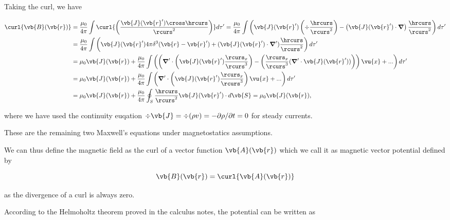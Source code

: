 \documentclass[english,a4paper,12pt]{report}
\begin{document}
Taking the curl, we have

\begin{equation} \label{ampere} 
    \begin{aligned} 
    \curl{\vb{B} (\vb{r} )} &=  \frac{\mu_0 }{4\pi } \int \curl{\left( \frac{\vb{J} (\vb{r} ') \cross \hrcurs}{\rcurs ^2 } \right)} d\tau ' =   \frac{\mu _{0} }{4\pi }\int \left(\vb{J} (\vb{r} ')\left( \div{\frac{\hrcurs }{\rcurs ^2} }  \right) - \left(\vb{J} (\vb{r} ')\cdot \boldsymbol{\nabla } \right)\frac{\hrcurs }{\rcurs ^2}  \right)  d\tau ' \\
    &= \frac{\mu_0 }{4\pi }\int \left( \vb{J} (\vb{r} ')4\pi \delta ^3 (\vb{r} -\vb{r} ') + (\vb{J}(\vb{r} ') \cdot \boldsymbol{\nabla }' )\frac{\hrcurs }{\rcurs ^2} \right)d\tau ' \\
    &= \mu_0 \vb{J} (\vb{r} ) + \frac{\mu_0 }{4\pi } \int \left(\left( \boldsymbol{\nabla }' \cdot \left( \vb{J} (\vb{r} ')  \frac{\rcurs _{x} }{\rcurs ^3 }   \right) - \left( \frac{\rcurs _{x} }{\rcurs ^3 } (\boldsymbol{\nabla }' \cdot \vb{J} (\vb{r} ') ) \right)  \right)\vu{x} + ...\right) d\tau ' \\
    &=  \mu_0 \vb{J} (\vb{r} )+ \frac{\mu_0 }{4\pi } \int \left( \boldsymbol{\nabla }' \cdot \left( \vb{J} (\vb{r} ')  \frac{\rcurs _{x} }{\rcurs ^3 }   \right)\vu{x} + ...\right) d\tau ' \\
    &= \mu_0 \vb{J} (\vb{r} ) + \frac{\mu_0 }{4\pi }  \oint_{S} \frac{\hrcurs }{\rcurs ^2} \vb{J} (\vb{r} ')\cdot d\vb{S} = \mu_0 \vb{J} (\vb{r} ),
    \end{aligned} 
\end{equation}

where we have used the continuity euqation \( \div{\vb{J} } = \div{(\rho v)}  = -\partial \rho /\partial t = 0\) for steady currents.  

These are the remaining two Maxwell's equations under magnetostatics assumptions.

We can thus define the magnetic field as the curl of a vector function \(\vb{A} (\vb{r} )\) which we call it as magnetic vector potential defined by 

\begin{equation}
    \vb{B} (\vb{r} ) = \curl{\vb{A} (\vb{r} )} 
\end{equation}

as the divergence of a curl is always zero.

According to the Helmoholtz theorem proved in the calculus notes, the potential can be written as  
\end{document}
